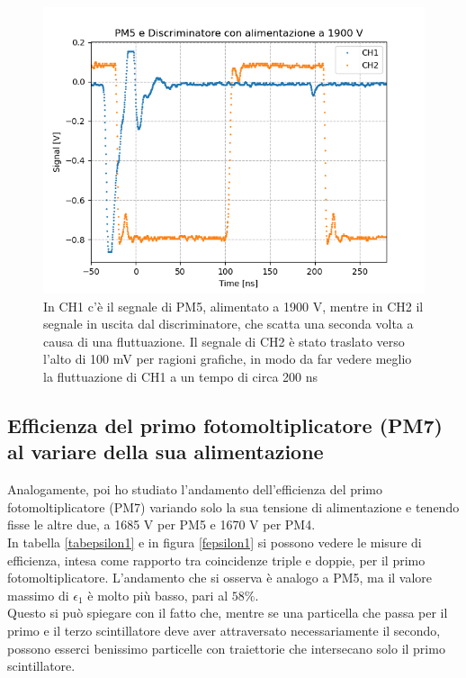 \documentclass{article}
\begin{document}
\begin{figure}[h!]
\begin{center}
\includegraphics[scale=0.7]{Grafici/PM5_rumore.png}
\caption{In CH1 c'è il segnale di PM5, alimentato a 1900 V, mentre in CH2 il segnale in uscita dal discriminatore, che scatta una seconda volta a causa di una fluttuazione. Il segnale di CH2 è stato traslato verso l'alto di 100 mV per ragioni grafiche, in modo da far vedere meglio la fluttuazione di CH1 a un tempo di circa 200 ns} \label{fnoise}
\end{center}
\end{figure}

\newpage
\subsection{Efficienza del primo fotomoltiplicatore (PM7) al variare della sua alimentazione}
Analogamente, poi ho studiato l'andamento dell'efficienza del primo fotomoltiplicatore (PM7) variando solo la sua tensione di alimentazione e tenendo fisse le altre due, a 1685 V per PM5 e 1670 V per PM4.
\\
In tabella \ref{tabepsilon1} e in figura  \ref{fepsilon1}  si possono vedere le misure di efficienza, intesa come rapporto tra coincidenze triple e doppie, per il primo fotomoltiplicatore. L'andamento che si osserva è analogo a PM5, ma il valore massimo di $\epsilon_1$ è molto più basso, pari al $58\%$.\\
Questo si può spiegare con il fatto che, mentre se una particella che passa per il primo e il terzo scintillatore deve aver attraversato necessariamente il secondo, possono esserci benissimo particelle con traiettorie che intersecano solo il primo scintillatore. 
\end{document}
